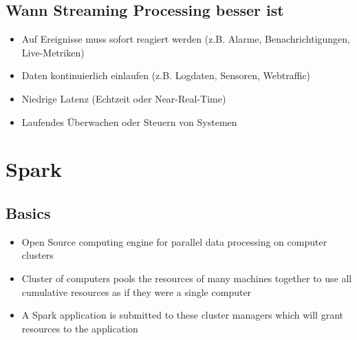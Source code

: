 \documentclass[11pt]{scrartcl}
\begin{document}
\subsection{Wann Streaming Processing besser ist}
\begin{itemize}
	\item Auf Ereignisse muss sofort reagiert werden (z.B. Alarme, Benachrichtigungen, Live-Metriken)
	\item Daten kontinuierlich einlaufen (z.B. Logdaten, Sensoren, Webtraffic)
	\item Niedrige Latenz (Echtzeit oder Near-Real-Time)
	\item Laufendes Überwachen oder Steuern von Systemen
\end{itemize}


\newpage
\section{Spark}
\subsection{Basics}
\begin{itemize}
	\item Open Source computing engine for parallel data processing on computer clusters
	\item Cluster of computers pools the resources of many machines together to use all cumulative resources as if they were a single computer
	\item A Spark application is submitted to these cluster managers which will grant resources to the application
\end{itemize}
\end{document}

